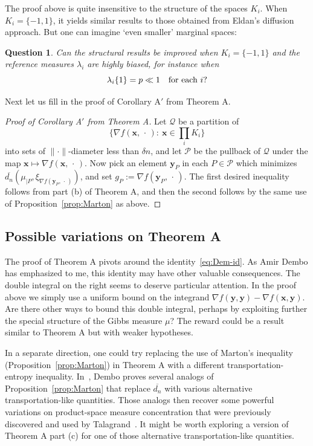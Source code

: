 \documentclass[aop,preprint]{imsart}
\newtheorem{ques}[thm]{Question}
\theoremstyle{remark}
\renewcommand{\bf}[1]{\boldsymbol{#1}}
\renewcommand{\P}{\mathcal{P}}
\newcommand{\Q}{\mathcal{Q}}
\renewcommand{\l}{\lambda}
\newcommand{\ol}[1]{\overline{#1}}
\begin{document}
The proof above is quite insensitive to the structure of the spaces $K_i$.  When $K_i = \{-1,1\}$, it yields similar results to those obtained from Eldan's diffusion approach.  But one can imagine `even smaller' marginal spaces:
	
\begin{ques}
	Can the structural results be improved when $K_i = \{-1,1\}$ and the reference measures $\l_i$ are highly biased, for instance when
	\[\l_i\{1\} = p \ll 1 \quad \hbox{for each}\ i?\]
	\end{ques}

Next let us fill in the proof of Corollary A$'$ from Theorem A.

\begin{proof}[Proof of Corollary A$'$ from Theorem A]
	Let $\Q$ be a partition of
\[\Big\{\nabla f(\bf{x},\,\cdot\,):\ \bf{x} \in \prod_i K_i\Big\}\]
into sets of $\|\cdot\|$-diameter less than $\delta n$, and let $\P$ be the pullback of $\Q$ under the map $\bf{x}\mapsto \nabla f(\bf{x},\,\cdot\,)$. Now pick an element $\bf{y}_P$ in each $P\in \P$ which minimizes $\ol{d_n}(\mu_{|P},\xi_{\nabla f(\bf{y}_P,\,\cdot\,)})$, and set $g_P := \nabla f(\bf{y}_P,\,\cdot\,)$.  The first desired inequality follows from part (b) of Theorem A, and then the second follows by the same use of Proposition~\ref{prop:Marton} as above.
\end{proof}



\subsection{Possible variations on Theorem A}

The proof of Theorem A pivots around the identity~\eqref{eq:Dem-id}.  As Amir Dembo has emphasized to me, this identity may have other valuable consequences.  The double integral on the right seems to deserve particular attention.  In the proof above we simply use a uniform bound on the integrand $\nabla f(\bf{y},\bf{y}) - \nabla f(\bf{x},\bf{y})$.  Are there other ways to bound this double integral, perhaps by exploiting further the special structure of the Gibbs measure $\mu$?  The reward could be a result similar to Theorem A but with weaker hypotheses.

In a separate direction, one could try replacing the use of Marton's inequality (Proposition~\ref{prop:Marton}) in Theorem A with a different transportation-entropy inequality.  In~\cite{Dem97}, Dembo proves several analogs of Proposition~\ref{prop:Marton} that replace $\ol{d_n}$ with various alternative transportation-like quantities.  Those analogs then recover some powerful variations on product-space measure concentration that were previously discovered and used by Talagrand~\cite{Tal95}.  It might be worth exploring a version of Theorem A part (c) for one of those alternative transportation-like quantities.
\end{document}
